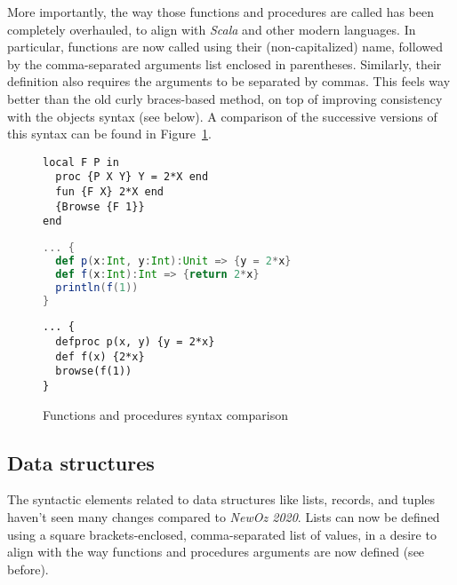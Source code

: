 More importantly, the way those functions and procedures are called has been completely overhauled, to align with \textit{Scala} and other modern languages.
In particular, functions are now called using their (non-capitalized) name, followed by the comma-separated arguments list enclosed in parentheses.
Similarly, their definition also requires the arguments to be separated by commas.
This feels way better than the old curly braces-based method, on top of improving consistency with the objects syntax (see below).
A comparison of the successive versions of this syntax can be found in Figure~\ref{fig:code-comp-fun}.
\begin{figure}
    \noindent\begin{minipage}{.49\textwidth}
\begin{lstlisting}[title={Oz},language=oz]
local F P in
  proc {P X Y} Y = 2*X end
  fun {F X} 2*X end
  {Browse {F 1}}
end
\end{lstlisting}
    \end{minipage}
    \hfill
    \noindent\begin{minipage}{.49\textwidth}
\begin{lstlisting}[title={Scala/Ozma},language=scala]
... {
  def p(x:Int, y:Int):Unit => {y = 2*x}
  def f(x:Int):Int => {return 2*x}
  println(f(1))
}
\end{lstlisting}
    \end{minipage}
    \begin{center}
    \noindent\begin{minipage}{.89\textwidth}
\begin{lstlisting}[title={NewOz 2020/2021},language=newoz]
... {
  defproc p(x, y) {y = 2*x}
  def f(x) {2*x}
  browse(f(1))
}
\end{lstlisting}
    \end{minipage}
    \end{center}
\caption{Functions and procedures syntax comparison}
\label{fig:code-comp-fun}
\end{figure}

\subsection{Data structures}
The syntactic elements related to data structures like lists, records, and tuples haven't seen many changes compared to \textit{NewOz 2020}.
Lists can now be defined using a square brackets-enclosed, comma-separated list of values, in a desire to align with the way functions and procedures arguments are now defined (see before).\newline


